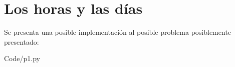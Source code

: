 \section{Los horas y las días}

Se presenta una posible implementación al posible problema posiblemente presentado:

 {Code/p1.py}
